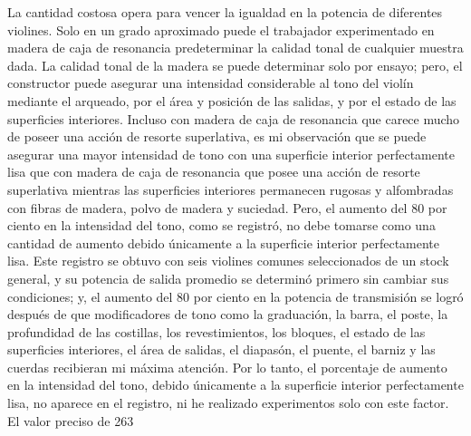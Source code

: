 La cantidad costosa opera para vencer la igualdad en la potencia de diferentes violines. Solo en un grado aproximado puede el trabajador experimentado en madera de caja de resonancia predeterminar la calidad tonal de cualquier muestra dada. La calidad tonal de la madera se puede determinar solo por ensayo; pero, el constructor puede asegurar una intensidad considerable al tono del violín mediante el arqueado, por el área y posición de las salidas, y por el estado de las superficies interiores. Incluso con madera de caja de resonancia que carece mucho de poseer una acción de resorte superlativa, es mi observación que se puede asegurar una mayor intensidad de tono con una superficie interior perfectamente lisa que con madera de caja de resonancia que posee una acción de resorte superlativa mientras las superficies interiores permanecen rugosas y alfombradas con fibras de madera, polvo de madera y suciedad. Pero, el aumento del 80 por ciento en la intensidad del tono, como se registró, no debe tomarse como una cantidad de aumento debido únicamente a la superficie interior perfectamente lisa. Este registro se obtuvo con seis violines comunes seleccionados de un stock general, y su potencia de salida promedio se determinó primero sin cambiar sus condiciones; y, el aumento del 80 por ciento en la potencia de transmisión se logró después de que modificadores de tono como la graduación, la barra, el poste, la profundidad de las costillas, los revestimientos, los bloques, el estado de las superficies interiores, el área de salidas, el diapasón, el puente, el barniz y las cuerdas recibieran mi máxima atención. Por lo tanto, el porcentaje de aumento en la intensidad del tono, debido únicamente a la superficie interior perfectamente lisa, no aparece en el registro, ni he realizado experimentos solo con este factor. El valor preciso de
263

